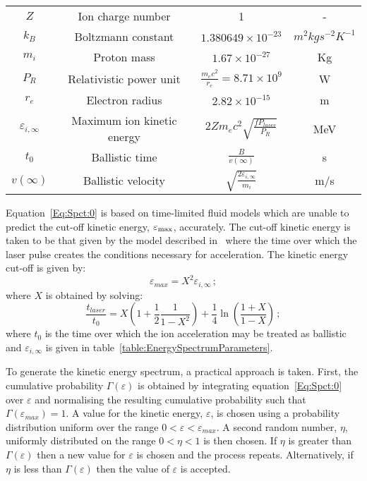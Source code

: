 \begin{table}
\begin{center}
\begin{tabular}{c c c c}
      $Z$ & Ion charge number & 1 & - \\  
      $k_{B}$ & Boltzmann constant & $1.380649 \times 10^{-23}$ & $m^{2} kg s^{-2} K^{-1}$ \\  
      $m_{i}$ & Proton mass & $1.67 \times 10^{-27}$ & Kg \\ 
      $P_{R}$ & Relativistic power unit & $\frac{m_{e} c^{2}}{r_{e}} = 8.71 \times 10^{9}$ & W \\  
      $r_{e}$ & Electron radius & $2.82 \times 10^{-15}$ & m \\  
      $\varepsilon_{i,\infty}$ & Maximum ion kinetic energy & $2 Z m_{e} c^{2} \sqrt{\frac{f P_{laser}}{P_{R}}}$ & MeV \\  
      $t_{0}$ & Ballistic time & $\frac{B}{v(\infty)}$ & s \\  
      $v(\infty)$ & Ballistic velocity & $\sqrt{\frac{2 \varepsilon_{i,\infty}}{m_{i}}}$ & m/s \\  
      \hline
    \end{tabular}
  \end{center}
\end{table}

Equation~\ref{Eq:Spct:0} is based on time-limited fluid models which
are unable to predict the cut-off kinetic energy, $\varepsilon_{\rm max}$,
accurately.
The cut-off kinetic energy is taken to be that given by the model
described in~\cite{10.1103/PhysRevLett.97.045005} where the time over
which the laser pulse creates the conditions necessary for
acceleration. 
The kinetic energy cut-off is given by:
\begin{equation}
  \varepsilon_{max} = X^{2} \varepsilon_{i,\infty} \, ;
  \label{eq:Eq:Spct:2}
\end{equation}
where $X$ is obtained by solving:
\begin{equation}
  \frac{t_{laser}}{t_{0}} = X \left( 1 + \frac{1}{2}
                           \frac{1}{1 - X^{2}} \right) +
                           \frac{1}{4} \ln \left( \frac{1+X}{1-X} \right) \, ;
  \label{eq:Eq:Spct:1}
\end{equation}
where $t_0$ is the time over which the ion acceleration may be treated
as ballistic and $\varepsilon_{i,\infty}$ is given in
table~\ref{table:EnergySpectrumParameters}.

To generate the kinetic energy spectrum, a practical approach is
taken.
First, the cumulative probability $\Gamma(\varepsilon)$ is obtained by
integrating equation~\ref{Eq:Spct:0} over $\varepsilon$ and normalising
the resulting cumulative probability such that
$\Gamma(\varepsilon_{max}) = 1$.
A value for the kinetic energy, $\varepsilon$, is chosen using a 
probability distribution uniform over the range
$0 < \varepsilon < \varepsilon_{max}$.
A second random number, $\eta$, uniformly distributed on the range
$0 < \eta < 1$ is then chosen.
If $\eta$ is greater than $\Gamma(\varepsilon)$ then a new value for
$\varepsilon$ is chosen and the process repeats.
Alternatively, if $\eta$ is less than $\Gamma(\varepsilon)$ then the
value of $\varepsilon$ is accepted.

